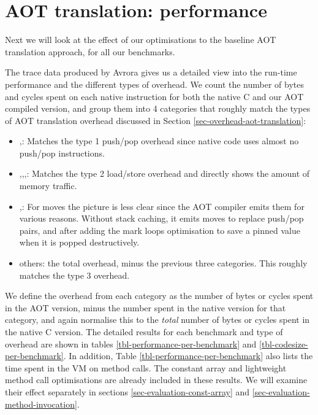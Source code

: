 


\section{AOT translation: performance}
\label{sec-evaluation-aot-translation-performance}

Next we will look at the effect of our optimisations to the baseline AOT translation approach, for all our benchmarks.

The trace data produced by Avrora gives us a detailed view into the run-time performance and the different types of overhead. We count the number of bytes and cycles spent on each native instruction for both the native C and our AOT compiled version, and group them into 4 categories that roughly match the types of AOT translation overhead discussed in Section \ref{sec-overhead-aot-translation}:
\begin{itemize}
	\item {},: Matches the type 1 push/pop overhead since native code uses almost no push/pop instructions.
	\item {},,,: Matches the type 2 load/store overhead and directly shows the amount of memory traffic.
	\item {},: For moves the picture is less clear since the AOT compiler emits them for various reasons. Without stack caching, it emits moves to replace push/pop pairs, and after adding the mark loops optimisation to save a pinned value when it is popped destructively.
	\item others: the total overhead, minus the previous three categories. This roughly matches the type 3 overhead.
\end{itemize}

We define the overhead from each category as the number of bytes or cycles spent in the AOT version, minus the number spent in the native version for that category, and again normalise this to the \emph{total} number of bytes or cycles spent in the native C version. The detailed results for each benchmark and type of overhead are shown in tables \ref{tbl-performance-per-benchmark} and \ref{tbl-codesize-per-benchmark}. In addition, Table \ref{tbl-performance-per-benchmark} also lists the time spent in the VM on method calls. The constant array and lightweight method call optimisations are already included in these results. We will examine their effect separately in sections \ref{sec-evaluation-const-array} and \ref{sec-evaluation-method-invocation}.

